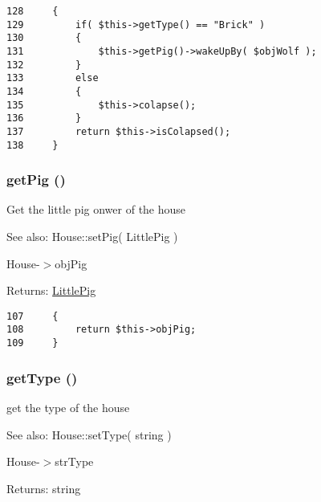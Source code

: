 \begin{Code}\begin{verbatim}128     {
129         if( $this->getType() == "Brick" )
130         {
131             $this->getPig()->wakeUpBy( $objWolf );
132         }
133         else
134         {
135             $this->colapse();
136         }
137         return $this->isColapsed();
138     }
\end{verbatim}
\end{Code}


\hypertarget{class_house_6b0a38021f87bca50710aba818be2809}{
\subsubsection[{getPig}]{\setlength{\rightskip}{0pt plus 5cm}getPig ()}}
\label{class_house_6b0a38021f87bca50710aba818be2809}


Get the little pig onwer of the house

\begin{Desc}
\item[See also:]House::setPig( LittlePig ) 

House-$>$objPig \end{Desc}
\begin{Desc}
\item[Returns:]\hyperlink{class_little_pig}{LittlePig} \end{Desc}


\begin{Code}\begin{verbatim}107     {
108         return $this->objPig;
109     }
\end{verbatim}
\end{Code}


\hypertarget{class_house_830b5c75df72b32396701bc563fbe3c7}{
\subsubsection[{getType}]{\setlength{\rightskip}{0pt plus 5cm}getType ()}}
\label{class_house_830b5c75df72b32396701bc563fbe3c7}


get the type of the house

\begin{Desc}
\item[See also:]House::setType( string ) 

House-$>$strType \end{Desc}
\begin{Desc}
\item[Returns:]string \end{Desc}


